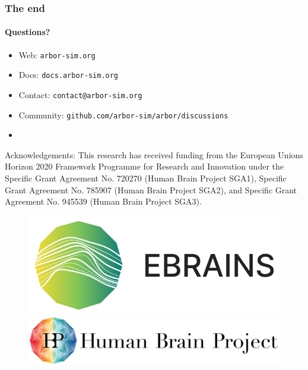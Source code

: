 \documentclass[t]{beamer}
\begin{document}
\begin{frame}
    \frametitle{The end}
    \framesubtitle{Questions?}
    \begin{itemize}
        \item Web: \texttt{arbor-sim.org}
        \item Docs: \texttt{docs.arbor-sim.org}
        \item Contact: \texttt{contact@arbor-sim.org}
        \item Community: \texttt{github.com/arbor-sim/arbor/discussions}
        \item[]
    \end{itemize}

    { \scriptsize Acknowledgements: This research has received funding from the European Unions
    Horizon 2020 Framework Programme for Research and
    Innovation under the Specific Grant Agreement No. 720270
    (Human Brain Project SGA1), Specific Grant Agreement No.
    785907 (Human Brain Project SGA2), and Specific Grant
    Agreement No. 945539 (Human Brain Project SGA3). }
    \newline
    \begin{figure}[h]
        \begin{center}
            \includegraphics[width=0.2\linewidth]{ebrains_logo.png}
            \hspace{2em}
            \includegraphics[width=0.4\linewidth]{HBP_logo.jpg}
        \end{center}
    \end{figure}
\end{frame}
\end{document}
